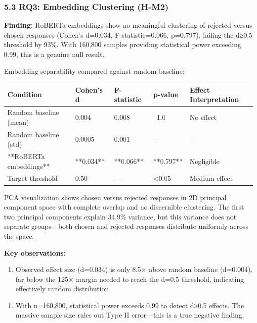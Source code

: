 \subsubsection{5.3 RQ3: Embedding Clustering (H-M2)}

\textbf{Finding:} RoBERTa embeddings show no meaningful clustering of rejected versus chosen responses (Cohen's d=0.034, F-statistic=0.066, p=0.797), failing the d≥0.5 threshold by 93\%. With 160,800 samples providing statistical power exceeding 0.99, this is a genuine null result.

Embedding separability compared against random baseline:

\begin{table}[htbp]
\centering
\begin{tabular}{lllll}
\toprule
Condition & Cohen's d & F-statistic & p-value & Effect Interpretation \\
\midrule
Random baseline (mean) & 0.004 & 0.008 & ~1.0 & No effect \\
Random baseline (std) & 0.0005 & 0.001 & — & — \\
**RoBERTa embeddings** & **0.034** & **0.066** & **0.797** & Negligible \\
Target threshold & 0.50 & — & <0.05 & Medium effect \\
\bottomrule
\end{tabular}
\end{table}

PCA visualization shows chosen versus rejected responses in 2D principal component space with complete overlap and no discernible clustering. The first two principal components explain 34.9\% variance, but this variance does not separate groups—both chosen and rejected responses distribute uniformly across the space.

\textbf{Key observations:}

\begin{enumerate}
\item Observed effect size (d=0.034) is only 8.5× above random baseline (d=0.004), far below the 125× margin needed to reach the d=0.5 threshold, indicating effectively random distribution.
\end{enumerate}

\begin{enumerate}
\item With n=160,800, statistical power exceeds 0.99 to detect d≥0.5 effects. The massive sample size rules out Type II error—this is a true negative finding.
\end{enumerate}

